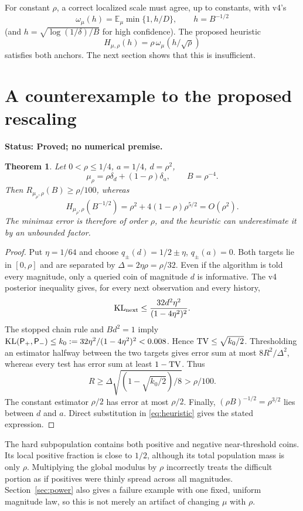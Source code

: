 \documentclass[11pt]{article}
\newtheorem{theorem}{Theorem}[section]
\theoremstyle{definition}\newtheorem{conjecture}[theorem]{Conjecture}
\theoremstyle{remark}\newtheorem{remark}[theorem]{Remark}
\newcommand{\E}{\mathbb E}\newcommand{\PP}{\mathbb P}\newcommand{\R}{\mathbb R}
\newcommand{\status}[1]{\par\smallskip\noindent\textbf{Status: #1.}\par}
\begin{document}
For constant $\rho$, a correct localized scale must agree, up to constants, with v4's
\[
 \omega_\mu(h)=\E_\mu\min\{1,h/D\},\qquad h=B^{-1/2}
\]
(and $h=\sqrt{\log(1/\delta)/B}$ for high confidence). The proposed heuristic
\begin{equation}\label{eq:heuristic}
 H_{\mu,\rho}(h)=\rho\,\omega_\mu(h/\sqrt\rho)
\end{equation}
satisfies both anchors. The next section shows that this is insufficient.

\section{A counterexample to the proposed rescaling}
\status{Proved; no numerical premise}
\begin{theorem}\label{thm:counter}
Let $0<\rho\le1/4$, $a=1/4$, $d=\rho^2$,
\[
 \mu_\rho=\rho\delta_d+(1-\rho)\delta_a,\qquad B=\rho^{-4}.
\]
Then $R_{\mu_\rho,\rho}(B)\ge\rho/100$, whereas
\[
 H_{\mu_\rho,\rho}(B^{-1/2})
 =\rho^2+4(1-\rho)\rho^{5/2}=O(\rho^2).
\]
The minimax error is therefore of order $\rho$, and the heuristic can underestimate it by an unbounded factor.
\end{theorem}
\begin{proof}
Put $\eta=1/64$ and choose $q_\pm(d)=1/2\pm\eta$, $q_\pm(a)=0$. Both targets lie in $[0,\rho]$ and are separated by $\Delta=2\eta\rho=\rho/32$. Even if the algorithm is told every magnitude, only a queried coin of magnitude $d$ is informative. The v4 posterior inequality gives, for every next observation and every history,
\[
 \operatorname{KL}_{\rm next}\le\frac{32d^2\eta^2}{(1-4\eta^2)^2}.
\]
The stopped chain rule and $Bd^2=1$ imply $\operatorname{KL}(\mathsf P_+,\mathsf P_-)\le k_0:=32\eta^2/(1-4\eta^2)^2<0.008$. Hence $\operatorname{TV}\le\sqrt{k_0/2}$. Thresholding an estimator halfway between the two targets gives error sum at most $8R^2/\Delta^2$, whereas every test has error sum at least $1-\operatorname{TV}$. Thus
\[
 R\ge\Delta\sqrt{(1-\sqrt{k_0/2})/8}>\rho/100.
\]
The constant estimator $\rho/2$ has error at most $\rho/2$. Finally, $(\rho B)^{-1/2}=\rho^{3/2}$ lies between $d$ and $a$. Direct substitution in \eqref{eq:heuristic} gives the stated expression.
\end{proof}

The hard subpopulation contains both positive and negative near-threshold coins. Its local positive fraction is close to $1/2$, although its total population mass is only $\rho$. Multiplying the global modulus by $\rho$ incorrectly treats the difficult portion as if positives were thinly spread across all magnitudes. Section~\ref{sec:power} also gives a failure example with one fixed, uniform magnitude law, so this is not merely an artifact of changing $\mu$ with $\rho$.
\end{document}
